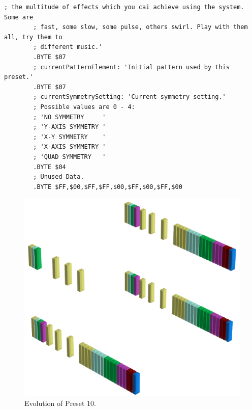 \begin{lstlisting}[basicstyle=\tiny,caption=Source code for Preset 9.]
        ; the multitude of effects which you cai achieve using the system. Some are
        ; fast, some slow, some pulse, others swirl. Play with them all, try them to
        ; different music.'
        .BYTE $07
        ; currentPatternElement: 'Initial pattern used by this preset.'
        .BYTE $07
        ; currentSymmetrySetting: 'Current symmetry setting.'
        ; Possible values are 0 - 4:
        ; 'NO SYMMETRY     '
        ; 'Y-AXIS SYMMETRY '
        ; 'X-Y SYMMETRY    '
        ; 'X-AXIS SYMMETRY '
        ; 'QUAD SYMMETRY   '
        .BYTE $04
        ; Unused Data.
        .BYTE $FF,$00,$FF,$FF,$00,$FF,$00,$FF,$00
\end{lstlisting}


\clearpage                                                                 
\begin{figure}[H]                                                          
    \centering                                                             
    \begin{adjustbox}{width=14cm,center}                                   
      \includegraphics[width=14cm]{src/presets/pattern10-45.png}%
    \end{adjustbox}                                                        
\caption{Evolution of Preset 10.}                                           
\end{figure}                                                               
\clearpage                                                                 
                                                                           
